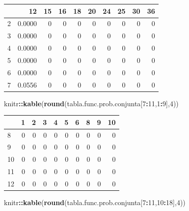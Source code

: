 \documentclass[]{book}
\newenvironment{Shaded}{\begin{snugshade}}{\end{snugshade}}
\newcommand{\DecValTok}[1]{\textcolor[rgb]{0.00,0.00,0.81}{#1}}
\newcommand{\KeywordTok}[1]{\textcolor[rgb]{0.13,0.29,0.53}{\textbf{#1}}}
\newcommand{\NormalTok}[1]{#1}
\newcommand{\OperatorTok}[1]{\textcolor[rgb]{0.81,0.36,0.00}{\textbf{#1}}}
\begin{document}
\begin{tabular}{l|r|r|r|r|r|r|r|r|r}
\hline
  & 12 & 15 & 16 & 18 & 20 & 24 & 25 & 30 & 36\\
\hline
2 & 0.0000 & 0 & 0 & 0 & 0 & 0 & 0 & 0 & 0\\
\hline
3 & 0.0000 & 0 & 0 & 0 & 0 & 0 & 0 & 0 & 0\\
\hline
4 & 0.0000 & 0 & 0 & 0 & 0 & 0 & 0 & 0 & 0\\
\hline
5 & 0.0000 & 0 & 0 & 0 & 0 & 0 & 0 & 0 & 0\\
\hline
6 & 0.0000 & 0 & 0 & 0 & 0 & 0 & 0 & 0 & 0\\
\hline
7 & 0.0556 & 0 & 0 & 0 & 0 & 0 & 0 & 0 & 0\\
\hline
\end{tabular}

\begin{Shaded}
\begin{Highlighting}[]
\NormalTok{knitr}\OperatorTok{::}\KeywordTok{kable}\NormalTok{(}\KeywordTok{round}\NormalTok{(tabla.func.prob.conjunta[}\DecValTok{7}\OperatorTok{:}\DecValTok{11}\NormalTok{,}\DecValTok{1}\OperatorTok{:}\DecValTok{9}\NormalTok{],}\DecValTok{4}\NormalTok{))}
\end{Highlighting}
\end{Shaded}

\begin{tabular}{l|r|r|r|r|r|r|r|r|r}
\hline
  & 1 & 2 & 3 & 4 & 5 & 6 & 8 & 9 & 10\\
\hline
8 & 0 & 0 & 0 & 0 & 0 & 0 & 0 & 0 & 0\\
\hline
9 & 0 & 0 & 0 & 0 & 0 & 0 & 0 & 0 & 0\\
\hline
10 & 0 & 0 & 0 & 0 & 0 & 0 & 0 & 0 & 0\\
\hline
11 & 0 & 0 & 0 & 0 & 0 & 0 & 0 & 0 & 0\\
\hline
12 & 0 & 0 & 0 & 0 & 0 & 0 & 0 & 0 & 0\\
\hline
\end{tabular}

\begin{Shaded}
\begin{Highlighting}[]
\NormalTok{knitr}\OperatorTok{::}\KeywordTok{kable}\NormalTok{(}\KeywordTok{round}\NormalTok{(tabla.func.prob.conjunta[}\DecValTok{7}\OperatorTok{:}\DecValTok{11}\NormalTok{,}\DecValTok{10}\OperatorTok{:}\DecValTok{18}\NormalTok{],}\DecValTok{4}\NormalTok{))}
\end{Highlighting}
\end{Shaded}
\end{document}
